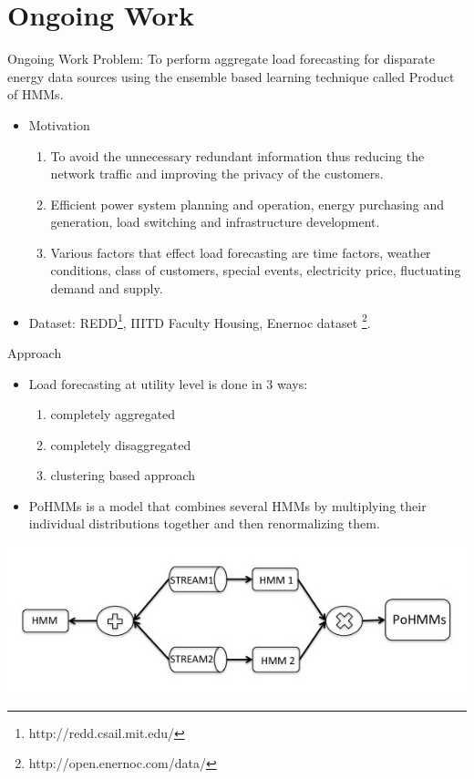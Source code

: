 \documentclass{beamer}
\begin{document}
\section{Ongoing Work}
\begin{frame}{Ongoing Work}
Problem: To perform aggregate load forecasting for disparate energy data sources using the ensemble based learning technique called Product of HMMs. \\

%
\begin{itemize}
\item<1-> Motivation
\begin{enumerate}
\item<2->  To avoid the unnecessary redundant information thus reducing the network traffic and improving the privacy of  the customers.
\item<3-> Efficient power system planning and operation, energy purchasing and generation, load switching and infrastructure development. 
\item<4-> Various factors that effect load forecasting are time factors, weather conditions, class of customers, special events, electricity price, fluctuating demand and supply.

\end{enumerate}
\item<4-> Dataset: REDD\footnote{http://redd.csail.mit.edu/}, IIITD Faculty Housing, Enernoc dataset \footnote{http://open.enernoc.com/data/}.

\end{itemize}
\end{frame}

\begin{frame}{Approach}
\begin{itemize}
\item Load forecasting at utility level is done in 3 ways:
\begin{enumerate}
\item completely aggregated
\item completely disaggregated
\item clustering based approach
\end{enumerate}
\item PoHMMs is a model that combines several HMMs by multiplying their individual distributions together and then renormalizing them.
\end{itemize}
\begin{center}
\includegraphics[height=1 in]{images/chart.jpg}
\end{center}
\end{frame}
\end{document}
